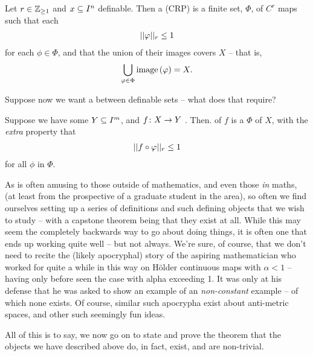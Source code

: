 \begin{definition}
  Let $r \in \Zgeq{1}$ and $\CIn[x]{n}$ definable. Then a \emph{\cellrparam} (CRP) is a finite set, $\Phi$, of  $C^r$ \cellr maps such that each
    \begin{align*}
      \rnorm[r]{\phi} \leq 1
    \end{align*}
  for each $\phi \in \Phi$, and that the union of their images covers $X$ -- that is,
    \begin{align*}
      \bigcup_{\phi \in \Phi} \image{\phi} = X.
    \end{align*}
\end{definition}
Suppose now we want a \cellrparam between definable sets -- what does that require?
\begin{definition}
  Suppose we have some $\CIn[Y]{m}$, and $\funcdom{f}{X}{Y}$ . Then. \cellrparam[r] of $f$ is a \cellrparam[r] $\Phi$ of $X$, with the \emph{extra} property that
    \begin{align*}
      \rnorm[r]{f \circ \phi} \leq 1
    \end{align*}
    for all $\phi$ in $\Phi$.
\end{definition}

As is often amusing to those outside of mathematics, and even those \emph{in} maths, (at least from the prospective of a graduate student in the area), so often we find ourselves setting up a series of definitions and such defining objects that we wish to study -- with a capstone theorem being that they exist at all. While this may seem the completely backwards way to go about doing things, it is often one that ends up working quite well -- but not always. We're sure, of course, that we don't need to recite the (likely apocryphal) story of the aspiring mathematician who worked for quite a while in this way on H\"older continuous maps with $\alpha < 1$ -- having only before seen the case with alpha exceeding 1. It was only at his defense that he was asked to show an example of an \emph{non-constant} example -- of which none exists. Of course, similar such apocrypha exist about anti-metric spaces, and other such seemingly fun ideas.

All of this is to say, we now go on to state and prove the theorem that the objects we have described above do, in fact, exist, and are non-trivial.

